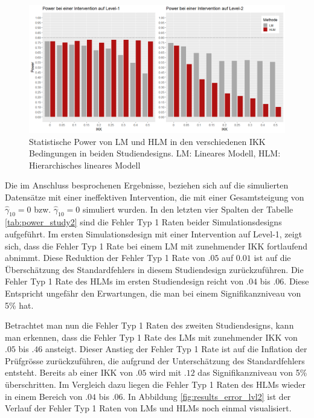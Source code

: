 \documentclass[12pt]{article}\usepackage[]{graphicx}\usepackage[]{color}
\begin{document}
\begin{figure}[t!]
\centering
\captionsetup{width=\textwidth}
\includegraphics[width = \textwidth]{results_power}
\caption{Statistische Power von LM und HLM in den verschiedenen IKK Bedingungen in beiden Studiendesigns. LM: Lineares Modell, HLM: Hierarchisches lineares Modell}
\label{fig:results_power}
\end{figure}

Die im Anschluss besprochenen Ergebnisse, beziehen sich auf die simulierten Datensätze mit einer ineffektiven Intervention, die mit einer Gesamtsteigung von $\widehat{\gamma}_{10} = 0$ bzw. $\widehat{\gamma}_{10} = 0$ simuliert wurden. In den letzten vier Spalten der Tabelle \ref{tab:power_study2} sind die Fehler Typ 1 Raten beider Simulationsdesigns aufgeführt. Im ersten Simulationsdesign mit einer Intervention auf Level-1, zeigt sich, dass die Fehler Typ 1 Rate bei einem LM mit zunehmender IKK fortlaufend abnimmt. Diese Reduktion der Fehler Typ 1 Rate von $.05$ auf $0.01$ ist auf die Überschätzung des Standardfehlers in diesem Studiendesign zurückzuführen. Die Fehler Typ 1 Rate des HLMs im ersten Studiendesign reicht von $.04$ bis $.06$. Diese Entspricht ungefähr den Erwartungen, die man bei einem Signifikanzniveau von 5\% hat.

Betrachtet man nun die Fehler Typ 1 Raten des zweiten Studiendesigns, kann man erkennen, dass die Fehler Typ 1 Rate des LMs mit zunehmender IKK von $.05$ bis $.46$ ansteigt. Dieser Anstieg der Fehler Typ 1 Rate ist auf die Inflation der Prüfgrösse zurückzuführen, die aufgrund der Unterschätzung des Standardfehlers entsteht. Bereits ab einer IKK von $.05$ wird mit $.12$ das Signifikanzniveau von 5\% überschritten. Im Vergleich dazu liegen die Fehler Typ 1 Raten des HLMs wieder in einem Bereich von $.04$ bis $.06$. In Abbildung \ref{fig:results_error_lvl2} ist der Verlauf der Fehler Typ 1 Raten von LMs und HLMs noch einmal visualisiert. 
\end{document}
